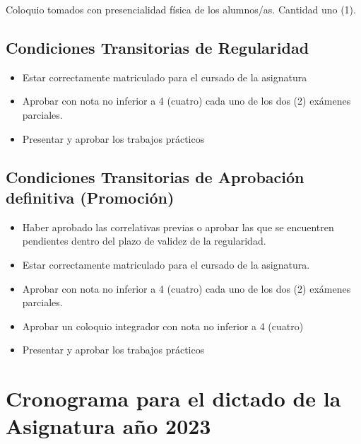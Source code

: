 Coloquio  tomados con presencialidad física de los alumnos/as. Cantidad uno (1).

\subsection*{Condiciones Transitorias de Regularidad}

\begin{itemize}
\item Estar correctamente matriculado para el cursado de la asignatura
\item Aprobar con nota no inferior a 4 (cuatro) cada uno de los  dos (2) exámenes parciales. 

\item Presentar y aprobar los trabajos prácticos
\end{itemize}

\subsection*{Condiciones Transitorias de Aprobación definitiva (Promoción) }


\begin{itemize}
\item Haber aprobado las correlativas previas o aprobar las que se encuentren pendientes dentro del plazo de validez de la regularidad.

\item  Estar correctamente matriculado para el cursado de la
  asignatura.
\item Aprobar con nota no inferior a 4 (cuatro) cada uno de los dos (2) exámenes parciales. 
\item Aprobar un coloquio integrador con nota no inferior a 4 (cuatro)
\item Presentar y aprobar los trabajos prácticos
\end{itemize}



\section*{Cronograma para el dictado de la Asignatura a\~no 2023}
\label{sec:00.cronograma}

